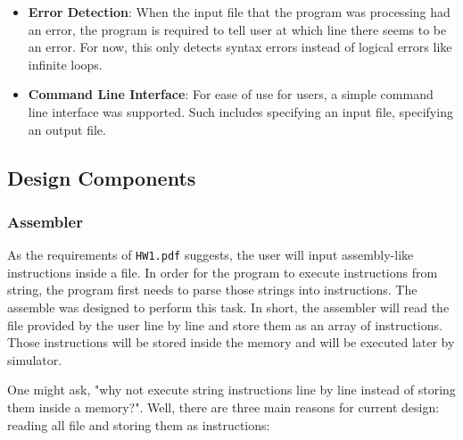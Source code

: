 \documentclass{homework}
\begin{document}
\begin{itemize}
    \item \textbf{Error Detection}: When the input file that the program was processing had an error, the program is required to tell user at which line there seems to be an error. For now, this only detects syntax errors instead of logical errors like infinite loops.
    \item \textbf{Command Line Interface}: For ease of use for users, a simple command line interface was supported. Such includes specifying an input file, specifying an output file. 
\end{itemize}

\subsection{Design Components}
\subsubsection{Assembler}
As the requirements of \texttt{HW1.pdf} suggests, the user will input assembly-like instructions inside a file. In order for the program to execute instructions from string, the program first needs to parse those strings into instructions. The assemble was designed to perform this task. In short, the assembler will read the file provided by the user line by line and store them as an array of instructions. Those instructions will be stored inside the memory and will be executed later by simulator.

One might ask, "why not execute string instructions line by line instead of storing them inside a memory?". Well, there are three main reasons for current design: reading all file and storing them as instructions:
\end{document}
